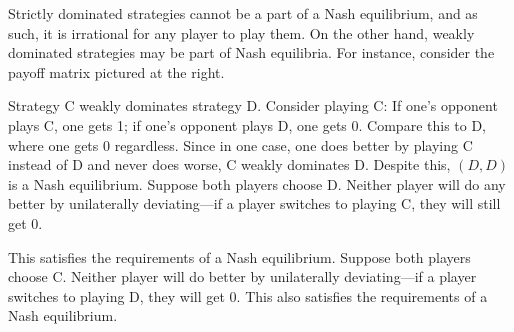 \documentclass[]{report}
\begin{document}
Strictly dominated strategies cannot be a part of a Nash equilibrium, and as such, it is irrational for any player to play them. On the other hand, weakly dominated strategies may be part of Nash equilibria. For instance, consider the payoff matrix pictured at the right.

Strategy C weakly dominates strategy D. Consider playing C: If one's opponent plays C, one gets 1; if one's opponent plays D, one gets 0. Compare this to D, where one gets 0 regardless. Since in one case, one does better by playing C instead of D and never does worse, C weakly dominates D. Despite this, ${\displaystyle (D,D)}$ is a Nash equilibrium. Suppose both players choose D. Neither player will do any better by unilaterally deviating—if a player switches to playing C, they will still get 0. 

This satisfies the requirements of a Nash equilibrium. Suppose both players choose C. Neither player will do better by unilaterally deviating—if a player switches to playing D, they will get 0. This also satisfies the requirements of a Nash equilibrium.
\end{document}
